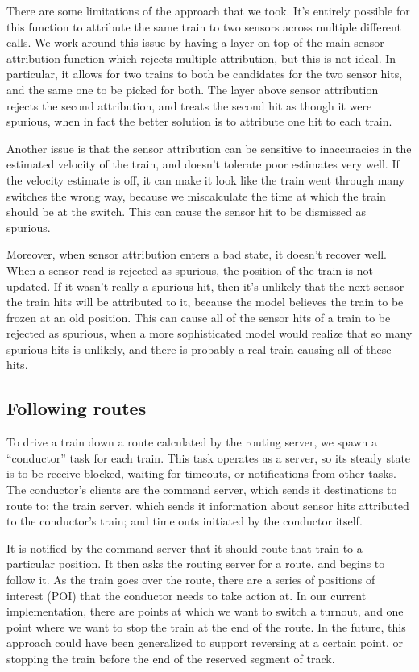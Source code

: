 \documentclass{article}
\begin{document}
There are some limitations of the approach that we took.
It's entirely possible for this function to attribute the same train to two sensors across multiple different calls.
We work around this issue by having a layer on top of the main sensor attribution function which rejects multiple
attribution, but this is not ideal.
In particular, it allows for two trains to both be candidates for the two sensor hits, and the same one to be picked for both.
The layer above sensor attribution rejects the second attribution, and treats the second hit as though it were spurious,
when in fact the better solution is to attribute one hit to each train.

Another issue is that the sensor attribution can be sensitive to inaccuracies in the estimated velocity of the train,
and doesn't tolerate poor estimates very well.
If the velocity estimate is off, it can make it look like the train went through many switches the wrong way, because
we miscalculate the time at which the train should be at the switch.
This can cause the sensor hit to be dismissed as spurious.

Moreover, when sensor attribution enters a bad state, it doesn't recover well.
When a sensor read is rejected as spurious, the position of the train is not updated.
If it wasn't really a spurious hit, then it's unlikely that the next sensor the train hits
will be attributed to it, because the model believes the train to be frozen at an old position.
This can cause all of the sensor hits of a train to be rejected as spurious, when a more sophisticated
model would realize that so many spurious hits is unlikely, and there is probably a real train
causing all of these hits.

\subsection{Following routes}
To drive a train down a route calculated by the routing server, we spawn a ``conductor'' task for each train.
This task operates as a server, so its steady state is to be receive blocked, waiting for timeouts, or notifications from other tasks.
The conductor's clients are the command server, which sends it destinations to route to; the train server, which
sends it information about sensor hits attributed to the conductor's train; and time outs initiated by the conductor itself.

It is notified by the command server that it should route that train to a particular position.
It then asks the routing server for a route, and begins to follow it.
As the train goes over the route, there are a series of positions of interest (POI) that the conductor needs to take
action at.
In our current implementation, there are points at which we want to switch a turnout, and one point where we want
to stop the train at the end of the route.
In the future, this approach could have been generalized to support reversing at a certain point, or stopping the train
before the end of the reserved segment of track.
\end{document}
